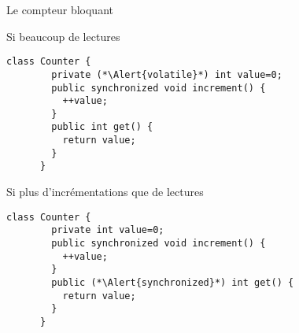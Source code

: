 
\begingroup

\begin{frame}[fragile]{Le compteur bloquant}

  \begin{block}{Si beaucoup de lectures}
    \begin{lstlisting}[gobble=6]
      class Counter {
        private (*\Alert{volatile}*) int value=0;
        public synchronized void increment() {
          ++value;
        }
        public int get() {
          return value;
        }
      }
    \end{lstlisting}
  \end{block}

  \begin{block}{Si plus d'incrémentations que de lectures}
    \begin{lstlisting}[gobble=6]
      class Counter {
        private int value=0;
        public synchronized void increment() {
          ++value;
        }
        public (*\Alert{synchronized}*) int get() {
          return value;
        }
      }
    \end{lstlisting}
  \end{block}

\end{frame}

\endgroup
\endinput
